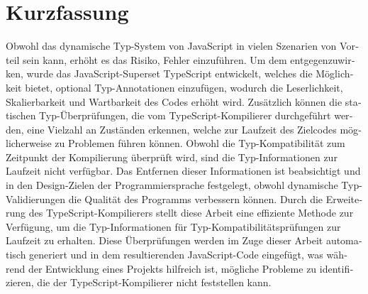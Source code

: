 \chapter{Kurzfassung}

\begin{german}
Obwohl das dynamische Typ-System von JavaScript in vielen Szenarien von Vorteil sein kann, erhöht es das Risiko, Fehler einzuführen. Um dem entgegenzuwirken, wurde das JavaScript-Superset TypeScript entwickelt, welches die Möglichkeit bietet, optional Typ-Annotationen einzufügen, wodurch die Leserlichkeit, Skalierbarkeit und Wartbarkeit des Codes erhöht wird. Zusätzlich können die statischen Typ-Überprüfungen, die vom TypeScript-Kompilierer durchgeführt werden, eine Vielzahl an Zuständen erkennen, welche zur Laufzeit des Zielcodes möglicherweise zu Problemen führen können. Obwohl die Typ-Kompatibilität zum Zeitpunkt der Kompilierung überprüft wird, sind die Typ-Informationen zur Laufzeit nicht verfügbar. Das Entfernen dieser Informationen ist beabsichtigt und in den Design-Zielen der Programmiersprache festgelegt, obwohl dynamische Typ-Validierungen die Qualität des Programms verbessern können. Durch die Erweiterung des TypeScript-Kompilierers stellt diese Arbeit eine effiziente Methode zur Verfügung, um die Typ-Informationen für Typ-Kompatibilitätsprüfungen zur Laufzeit zu erhalten. Diese Überprüfungen werden im Zuge dieser Arbeit automatisch generiert und in dem resultierenden JavaScript-Code eingefügt, was während der Entwicklung eines Projekts hilfreich ist, mögliche Probleme zu identifizieren, die der TypeScript-Kompilierer nicht feststellen kann.
\end{german}
